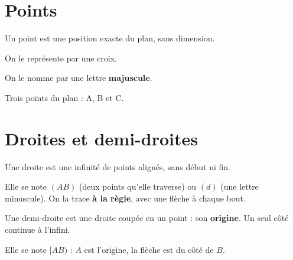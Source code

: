 \documentclass[11pt]{article}
\begin{document}
\section{Points}

\begin{definition}
  Un point est une position exacte du plan, sans dimension.
\end{definition}

\begin{notation}
  \begin{enuspaced}
  \item On le représente par une croix.
  \item On le nomme par une lettre \textbf{majuscule}.
  \end{enuspaced}
\end{notation}

\begin{exemple}
Trois points du plan : A, B et C. \\
\end{exemple}

\section{Droites et demi-droites}

\begin{definition}
  Une droite est une infinité de points alignés, sans début ni fin.
\end{definition}

\begin{notation}
  Elle se note $(AB)$ (deux points qu'elle traverse) ou $(d)$ (une
  lettre minuscule). On la trace \textbf{à la règle}, avec une flèche
  à chaque bout.
\end{notation}

\begin{definition}
  Une demi-droite est une droite coupée en un point : son
  \textbf{origine}. Un seul côté continue à l'infini.
\end{definition}

\begin{notation}
  Elle se note $[AB)$ : $A$ est l'origine, la flèche est du côté de $B$.
\end{notation}
\end{document}
